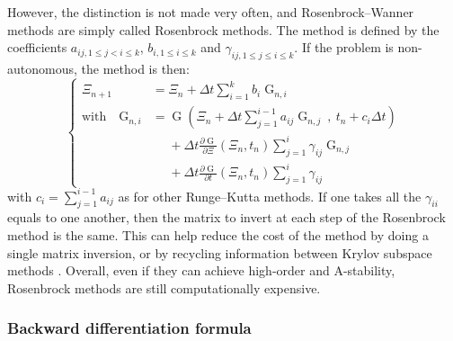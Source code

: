         However, the distinction is not made very often, and Rosenbrock--Wanner methods are simply called Rosenbrock methods.
        The method is defined by the coefficients $a_{ij, 1\leq j<i\leq k}$, $b_{i, 1\leq i\leq k}$ and $\gamma_{ij, 1\leq j\leq i\leq k}$.
        If the problem is non-autonomous, the method is then:
        \begin{equation}
          \left\{\begin{aligned}
            \Xi_{n+1} &= \Xi_n + \Delta t \sum_{i = 1}^k b_i \operatorname{G}_{n,i} \\
            \textrm{with}\quad \operatorname{G}_{n,i} &=
              \operatorname{G}\left(\Xi_n + \Delta t \sum_{j = 1}^{i-1} a_{ij} \operatorname{G}_{n,j} \ ,\  t_n + c_i \Delta t\right)\\
              &\phantom{= {}} +\Delta t \frac{\partial \operatorname{G}}{\partial \Xi}\left(\Xi_n, t_n\right) \sum_{j = 1}^{i} \gamma_{ij} \operatorname{G}_{n,j} \\
              &\phantom{= {}} +\Delta t \frac{\partial \operatorname{G}}{\partial t}\left(\Xi_n, t_n\right) \sum_{j = 1}^i \gamma_{ij}
          \end{aligned}\right.
        \end{equation}
        with $c_i = \sum_{j = 1}^{i - 1} a_{ij}$ as for other Runge--Kutta methods.
        If one takes all the $\gamma_{ii}$ equals to one another, then the matrix to invert at each step of the Rosenbrock method is the same.
        This can help reduce the cost of the method by doing a single matrix inversion, or by recycling information between Krylov subspace methods \cite{Gaul2014}.
        Overall, even if they can achieve high-order and A-stability, Rosenbrock methods are still computationally expensive.


      \subsubsection{Backward differentiation formula}

